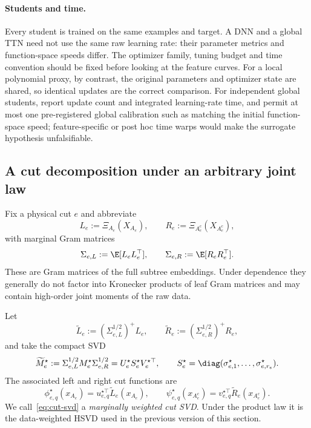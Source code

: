 \paragraph{Students and time.}
Every student is trained on the same examples and target.  A DNN and a global TTN need not use the
same raw learning rate: their parameter metrics and function-space speeds differ.  The optimizer
family, tuning budget and time convention should be fixed before looking at the feature curves.
For a local polynomial proxy, by contrast, the original parameters and optimizer state are shared,
so identical updates are the correct comparison.  For independent global students, report update
count and integrated learning-rate time, and permit at most one pre-registered global calibration
such as matching the initial function-space speed; feature-specific or post hoc time warps would
make the surrogate hypothesis unfalsifiable.

\subsection{A cut decomposition under an arbitrary joint law}\label{sec:dw-hsvd}

Fix a physical cut $e$ and abbreviate
\[
 L_e:=\Xi_{A_e}(X_{A_e}),\qquad R_e:=\Xi_{A_e^c}(X_{A_e^c}),
\]
with marginal Gram matrices
\[
 \Sigma_{e,L}:=\E[L_eL_e^\top],\qquad
 \Sigma_{e,R}:=\E[R_eR_e^\top].
\]
These are Gram matrices of the full subtree embeddings.  Under dependence they generally do not
factor into Kronecker products of leaf Gram matrices and may contain high-order joint moments of
the raw data.

\begin{definition}\label{def:dw-hsvd}
Let
\[
 \widetilde L_e:=(\Sigma_{e,L}^{1/2})^+L_e,
 \qquad
 \widetilde R_e:=(\Sigma_{e,R}^{1/2})^+R_e,
\]
and take the compact SVD
\begin{equation}\label{eq:cut-svd}
 \widetilde M_e^\star
 :=\Sigma_{e,L}^{1/2}M_e^\star\Sigma_{e,R}^{1/2}
 =U_e^\star S_e^\star V_e^{\star\top},
 \qquad
 S_e^\star=\diag(\sigma_{e,1}^\star,\ldots,\sigma_{e,r_e}^\star).
\end{equation}
The associated left and right cut functions are
\begin{equation}\label{eq:singular-functions}
 \phi_{e,q}^\star(x_{A_e})=u_{e,q}^{\star\top}\widetilde L_e(x_{A_e}),
 \qquad
 \psi_{e,q}^\star(x_{A_e^c})=v_{e,q}^{\star\top}\widetilde R_e(x_{A_e^c}).
\end{equation}
We call~\eqref{eq:cut-svd} a \emph{marginally weighted cut SVD}.  Under the product law it is the
data-weighted HSVD used in the previous version of this section.
\end{definition}

